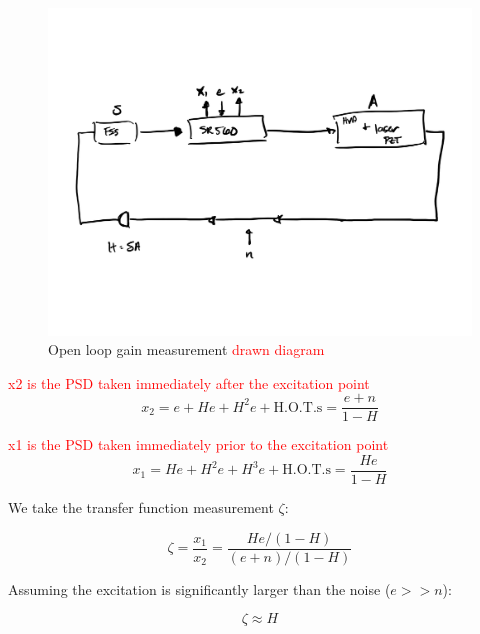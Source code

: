 \begin{figure}[H]
  \begin{center}
    \includegraphics[width=.5\textwidth]{figs/ALGAAS/Loop_gain_measurement_drawn_diagram.pdf}
    \caption{Open loop gain measurement \textcolor{red}{drawn diagram}}
  \end{center}
  \label{fig:OLGmath}
\end{figure}

\textcolor{red}{x2 is the PSD taken immediately after the excitation point}
\begin{equation}
x_2 = e + He + H^2 e + \mathrm{H.O.T.s} = \frac{e + n}{1-H}
\end{equation}

\textcolor{red}{x1 is the PSD taken immediately prior to the excitation point}
\begin{equation}
x_1 = He + H^2e + H^3e + \mathrm{H.O.T.s}  = \frac{He}{1-H}
\end{equation}

We take the transfer function measurement $\zeta$:

\begin{equation}
\zeta = \frac{x_1}{x_2} = \frac{He/(1-H)}{(e+n)/(1-H)}
\end{equation}

Assuming the excitation is significantly larger than the noise ($e>>n$):

\begin{equation}
\zeta \approx H
\end{equation}
